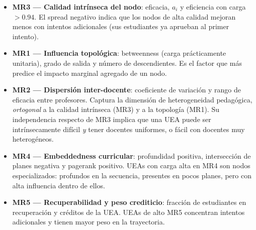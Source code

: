 \documentclass[11pt,letterpaper]{article}
\begin{document}
\begin{itemize}[leftmargin=2em]
  \item \textbf{MR3 — Calidad intrínseca del nodo}:
        eficacia, $a_i$ y eficiencia con carga $>0.94$.
        El spread negativo indica que los nodos de alta calidad mejoran menos
        con intentos adicionales (sus estudiantes ya aprueban al primer intento).

  \item \textbf{MR1 — Influencia topológica}:
        betweenness (carga prácticamente unitaria), grado de salida y
        número de descendientes.
        Es el factor que más predice el impacto marginal agregado de un nodo.

  \item \textbf{MR2 — Dispersión inter-docente}:
        coeficiente de variación y rango de eficacia entre profesores.
        Captura la dimensión de heterogeneidad pedagógica, \emph{ortogonal} a
        la calidad intrínseca (MR3) y a la topología (MR1).
        Su independencia respecto de MR3 implica que una UEA puede ser
        intrínsecamente difícil \emph{y} tener docentes uniformes, o
        fácil con docentes muy heterogéneos.

  \item \textbf{MR4 — Embeddedness curricular}:
        profundidad positiva, intersección de planes negativa y pagerank
        positivo.
        UEAs con carga alta en MR4 son nodos especializados:
        profundos en la secuencia, presentes en pocos planes, pero
        con alta influencia dentro de ellos.

  \item \textbf{MR5 — Recuperabilidad y peso crediticio}:
        fracción de estudiantes en recuperación y créditos de la UEA.
        UEAs de alto MR5 concentran intentos adicionales y tienen mayor peso
        en la trayectoria.
\end{itemize}
\end{document}
